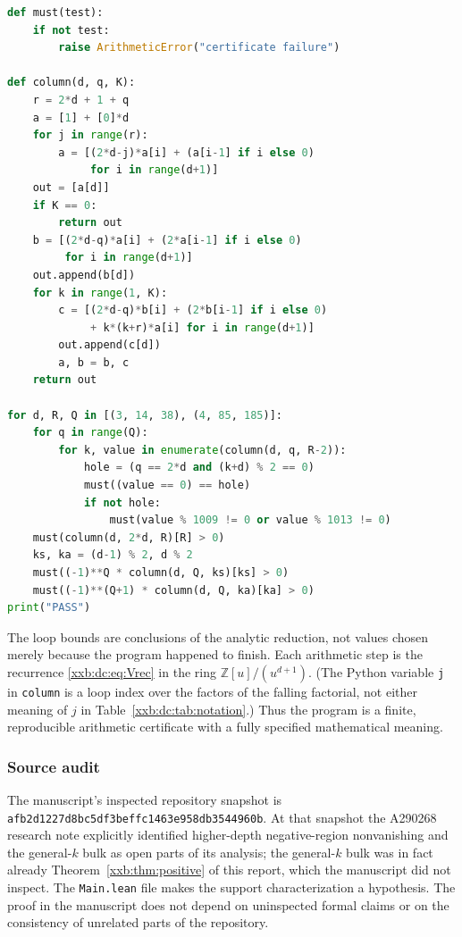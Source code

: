 \documentclass[11pt,a4paper]{article}
\numberwithin{equation}{section}
\theoremstyle{definition}
\theoremstyle{remark}
\theoremstyle{plain}
\newcommand{\Z}{\mathbb Z}
\begin{document}
\begin{lstlisting}[language=Python]
def must(test):
    if not test:
        raise ArithmeticError("certificate failure")

def column(d, q, K):
    r = 2*d + 1 + q
    a = [1] + [0]*d
    for j in range(r):
        a = [(2*d-j)*a[i] + (a[i-1] if i else 0)
             for i in range(d+1)]
    out = [a[d]]
    if K == 0:
        return out
    b = [(2*d-q)*a[i] + (2*a[i-1] if i else 0)
         for i in range(d+1)]
    out.append(b[d])
    for k in range(1, K):
        c = [(2*d-q)*b[i] + (2*b[i-1] if i else 0)
             + k*(k+r)*a[i] for i in range(d+1)]
        out.append(c[d])
        a, b = b, c
    return out

for d, R, Q in [(3, 14, 38), (4, 85, 185)]:
    for q in range(Q):
        for k, value in enumerate(column(d, q, R-2)):
            hole = (q == 2*d and (k+d) % 2 == 0)
            must((value == 0) == hole)
            if not hole:
                must(value % 1009 != 0 or value % 1013 != 0)
    must(column(d, 2*d, R)[R] > 0)
    ks, ka = (d-1) % 2, d % 2
    must((-1)**Q * column(d, Q, ks)[ks] > 0)
    must((-1)**(Q+1) * column(d, Q, ka)[ka] > 0)
print("PASS")
\end{lstlisting}

The loop bounds are conclusions of the analytic reduction, not values
chosen merely because the program happened to finish.  Each arithmetic
step is the recurrence \eqref{xxb:dc:eq:Vrec} in the ring $\Z[u]/(u^{d+1})$.
(The Python variable \texttt{j} in \texttt{column} is a loop index over the
factors of the falling factorial, not either meaning of $j$ in
Table~\ref{xxb:dc:tab:notation}.)  Thus the program is a finite, reproducible
arithmetic certificate with a fully specified mathematical meaning.

\subsubsection{Source audit}\label{xxb:dc:sec:audit}
The manuscript's inspected repository snapshot is
\texttt{afb2d1227d8bc5df\allowbreak 3beffc1463e958db\allowbreak 3544960b}.  At that snapshot the
A290268 research note explicitly identified higher-depth negative-region
nonvanishing and the general-$k$ bulk as open parts of its analysis; the
general-$k$ bulk was in fact already Theorem~\ref{xxb:thm:positive} of this
report, which the manuscript did not inspect.  The \texttt{Main.lean} file
makes the support characterization a hypothesis.  The proof in the manuscript
does not depend on uninspected formal claims or on the consistency of
unrelated parts of the repository.
\end{document}
